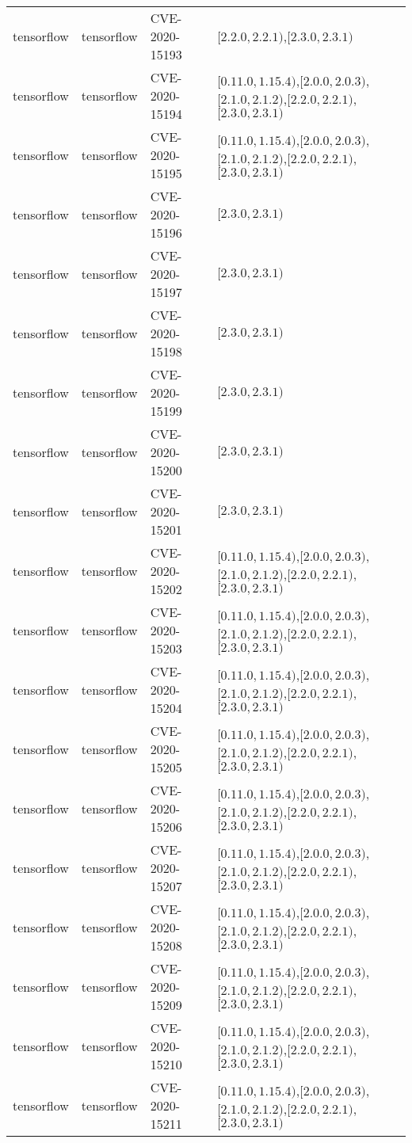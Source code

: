\begin{tabular}{llll}
tensorflow & tensorflow & CVE-2020-15193 & $[2.2.0,2.2.1)$,$[2.3.0,2.3.1)$ \\
tensorflow & tensorflow & CVE-2020-15194 & $[0.11.0,1.15.4)$,$[2.0.0,2.0.3)$,$[2.1.0,2.1.2)$,$[2.2.0,2.2.1)$,$[2.3.0,2.3.1)$ \\
tensorflow & tensorflow & CVE-2020-15195 & $[0.11.0,1.15.4)$,$[2.0.0,2.0.3)$,$[2.1.0,2.1.2)$,$[2.2.0,2.2.1)$,$[2.3.0,2.3.1)$ \\
tensorflow & tensorflow & CVE-2020-15196 & $[2.3.0,2.3.1)$ \\
tensorflow & tensorflow & CVE-2020-15197 & $[2.3.0,2.3.1)$ \\
tensorflow & tensorflow & CVE-2020-15198 & $[2.3.0,2.3.1)$ \\
tensorflow & tensorflow & CVE-2020-15199 & $[2.3.0,2.3.1)$ \\
tensorflow & tensorflow & CVE-2020-15200 & $[2.3.0,2.3.1)$ \\
tensorflow & tensorflow & CVE-2020-15201 & $[2.3.0,2.3.1)$ \\
tensorflow & tensorflow & CVE-2020-15202 & $[0.11.0,1.15.4)$,$[2.0.0,2.0.3)$,$[2.1.0,2.1.2)$,$[2.2.0,2.2.1)$,$[2.3.0,2.3.1)$ \\
tensorflow & tensorflow & CVE-2020-15203 & $[0.11.0,1.15.4)$,$[2.0.0,2.0.3)$,$[2.1.0,2.1.2)$,$[2.2.0,2.2.1)$,$[2.3.0,2.3.1)$ \\
tensorflow & tensorflow & CVE-2020-15204 & $[0.11.0,1.15.4)$,$[2.0.0,2.0.3)$,$[2.1.0,2.1.2)$,$[2.2.0,2.2.1)$,$[2.3.0,2.3.1)$ \\
tensorflow & tensorflow & CVE-2020-15205 & $[0.11.0,1.15.4)$,$[2.0.0,2.0.3)$,$[2.1.0,2.1.2)$,$[2.2.0,2.2.1)$,$[2.3.0,2.3.1)$ \\
tensorflow & tensorflow & CVE-2020-15206 & $[0.11.0,1.15.4)$,$[2.0.0,2.0.3)$,$[2.1.0,2.1.2)$,$[2.2.0,2.2.1)$,$[2.3.0,2.3.1)$ \\
tensorflow & tensorflow & CVE-2020-15207 & $[0.11.0,1.15.4)$,$[2.0.0,2.0.3)$,$[2.1.0,2.1.2)$,$[2.2.0,2.2.1)$,$[2.3.0,2.3.1)$ \\
tensorflow & tensorflow & CVE-2020-15208 & $[0.11.0,1.15.4)$,$[2.0.0,2.0.3)$,$[2.1.0,2.1.2)$,$[2.2.0,2.2.1)$,$[2.3.0,2.3.1)$ \\
tensorflow & tensorflow & CVE-2020-15209 & $[0.11.0,1.15.4)$,$[2.0.0,2.0.3)$,$[2.1.0,2.1.2)$,$[2.2.0,2.2.1)$,$[2.3.0,2.3.1)$ \\
tensorflow & tensorflow & CVE-2020-15210 & $[0.11.0,1.15.4)$,$[2.0.0,2.0.3)$,$[2.1.0,2.1.2)$,$[2.2.0,2.2.1)$,$[2.3.0,2.3.1)$ \\
tensorflow & tensorflow & CVE-2020-15211 & $[0.11.0,1.15.4)$,$[2.0.0,2.0.3)$,$[2.1.0,2.1.2)$,$[2.2.0,2.2.1)$,$[2.3.0,2.3.1)$ \\

\end{tabular}
